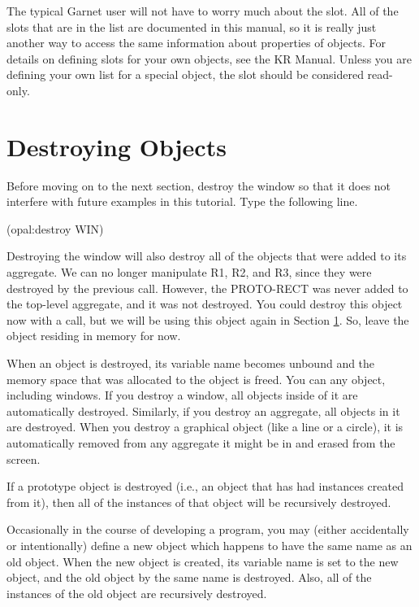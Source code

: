 The typical Garnet user will not have to worry much about the 
slot.  All of the slots that are in the list are documented in this manual,
so it is really just another way to access the same information about
properties of objects.  For details on defining  slots for
your own objects, see the KR Manual.  Unless you are defining your own
list for a special object, the  slot should be considered
read-only.


\section{Destroying Objects}
\label{destroying}

Before moving on to the next section, destroy the window so that it
does not interfere with future examples in this tutorial.  Type the
following line.

\begin{programexample}
(opal:destroy WIN)
\end{programexample}
				
Destroying the window will also destroy all of the objects that were
added to its aggregate.  We can no longer manipulate R1, R2, and R3,
since they were destroyed by the previous call.  However, the
PROTO-RECT was never added to the top-level aggregate, and it was not
destroyed.  You could destroy this object now with a 
call, but we will be using this object again in Section
\ref{destroying}.  So, leave the object residing in memory for now.

When an object is destroyed, its variable name becomes unbound and the
memory space that was allocated to the object is freed.  You can
 any object, including windows.  If you destroy a window,
all objects inside of it are automatically destroyed.  Similarly, if
you destroy an aggregate, all objects in it are destroyed.  When you
destroy a graphical object (like a line or a circle), it is
automatically removed from any aggregate it might be in and erased
from the screen.

If a prototype object is destroyed (i.e., an object that has had
instances created from it), then all of the instances of that object
will be recursively destroyed.

Occasionally in the course of developing a program, you may (either
accidentally or intentionally) define a new object which happens to
have the same name as an old object.  When the new object is created,
its variable name is set to the new object, and the old object by the
same name is destroyed.  Also, all of the instances of the old object
are recursively destroyed.

